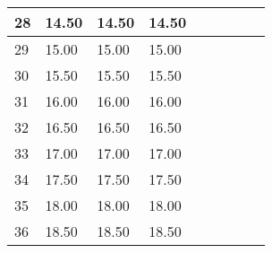 \begin{longtable}{lllllllrl}
 28 & 14.50                  & 14.50                  & 14.50                  &                                  &                   &                   &                                                                                     &                      \\ \hline
 29 & 15.00                  & 15.00                  & 15.00                  &                                  &                   &                   &                                                                                     &                      \\ \hline
 30 & 15.50                  & 15.50                  & 15.50                  &                                  &                   &                   &                                                                                     &                      \\ \hline
 31 & 16.00                  & 16.00                  & 16.00                  &                                  &                   &                   &                                                                                     &                      \\ \hline
 32 & 16.50                  & 16.50                  & 16.50                  &                                  &                   &                   &                                                                                     &                      \\ \hline
 33 & 17.00                  & 17.00                  & 17.00                  &                                  &                   &                   &                                                                                     &                      \\ \hline
 34 & 17.50                  & 17.50                  & 17.50                  &                                  &                   &                   &                                                                                     &                      \\ \hline
 35 & 18.00                  & 18.00                  & 18.00                  &                                  &                   &                   &                                                                                     &                      \\ \hline
 36 & 18.50                  & 18.50                  & 18.50                  &                                  &                   &                   &                                                                                     &                      \\ \hline

\end{longtable}

